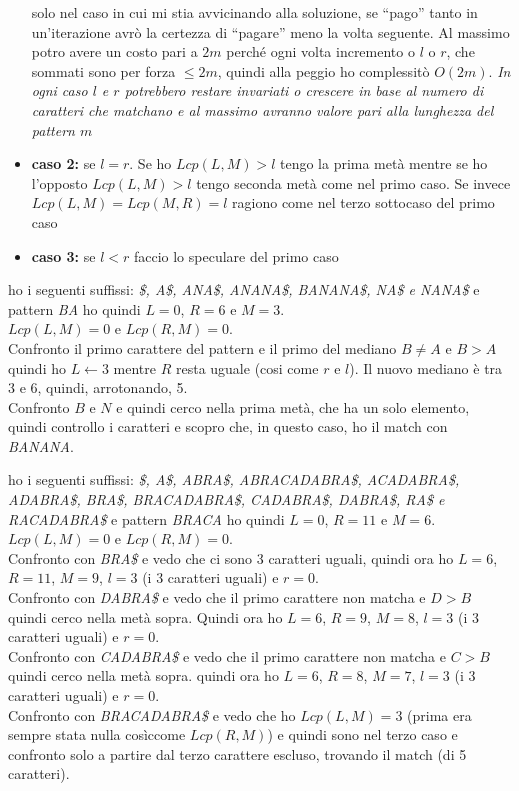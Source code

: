 \documentclass[a4paper,12pt, oneside]{book}
\begin{document}
\begin{itemize}
{    solo nel caso in cui mi stia avvicinando alla soluzione, se
    ``pago'' tanto in un'iterazione avrò la certezza di ``pagare''
    meno la volta seguente. Al massimo potro avere un costo pari a
    $2m$ perché ogni volta incremento o $l$ o $r$, che sommati sono
    per forza $\leq 2m$, quindi alla peggio ho complessitò $O(2m)$}.
  \textit{In ogni caso $l$ e $r$ potrebbero restare invariati o crescere in
    base al numero di caratteri che matchano e al massimo avranno valore
    pari alla lunghezza del pattern $m$}
  \item \textbf{caso 2:} se $l=r$. Se ho $Lcp(L,M)>l$ tengo la prima
  metà mentre se ho l'opposto   $Lcp(L,M)>l$ tengo seconda metà come
  nel primo caso.   Se invece $Lcp(L,M)=Lcp(M,R)=l$
  ragiono come nel terzo sottocaso del primo caso
  \item \textbf{caso 3:} se $l<r$ faccio lo speculare del primo caso 
\end{itemize}
\begin{esempio}
  ho i seguenti suffissi: \textit{\$, A\$, ANA\$, ANANA\$, BANANA\$,
    NA\$ e NANA\$} e pattern \textit{BA} ho quindi $L=0$, $R=6$ e $M=3$.\\
  $Lcp(L,M)=0$ e $Lcp(R,M)=0$.\\
  Confronto il primo carattere del pattern e il primo del mediano
  $B\neq A$ e $B>A$ quindi ho $L\gets 3$ mentre $R$ resta uguale (cosi
  come $r$ e $l$). Il nuovo mediano è tra 3 e 6, quindi, arrotonando,
  5.\\
  Confronto $B$ e $N$ e quindi cerco nella prima metà, che ha un solo
  elemento, quindi controllo i caratteri e scopro che, in questo caso,
  ho il match con \textit{BANANA}.
\end{esempio}
\begin{esempio}
  ho i seguenti suffissi: \textit{\$, A\$, ABRA\$, ABRACADABRA\$, ACADABRA\$,
    ADABRA\$, BRA\$, BRACADABRA\$, CADABRA\$, DABRA\$, RA\$ e
    RACADABRA\$} e pattern \textit{BRACA} ho quindi $L=0$, $R=11$ e $M=6$.\\
  $Lcp(L,M)=0$ e $Lcp(R,M)=0$.\\
  Confronto con \textit{BRA\$} e vedo che ci sono 3 caratteri uguali,
  quindi ora ho $L=6$, $R=11$, $M=9$, $l=3$ (i 3 caratteri uguali) e
  $r=0$.\\
  Confronto con \textit{DABRA\$} e vedo che il primo carattere non
  matcha e $D>B$ quindi cerco nella
  metà sopra. Quindi ora ho $L=6$, $R=9$, $M=8$, $l=3$ (i 3 caratteri uguali) e
  $r=0$.\\
  Confronto con \textit{CADABRA\$} e vedo che il primo carattere non
  matcha e $C>B$ quindi cerco nella  metà sopra.
  quindi ora ho $L=6$, $R=8$, $M=7$, $l=3$ (i 3 caratteri uguali) e
  $r=0$.\\
  Confronto con \textit{BRACADABRA\$} e vedo che ho $Lcp(L,M)=3$
  (prima era sempre stata nulla cosìccome $Lcp(R,M)$) e
  quindi sono nel terzo caso e confronto solo a partire dal terzo
  carattere escluso, trovando il match (di 5 caratteri).
\end{esempio}
\end{document}
